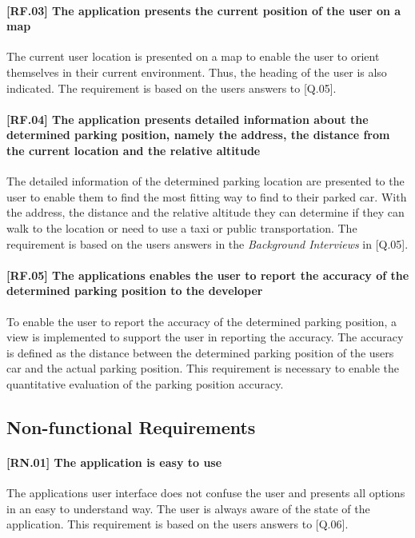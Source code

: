 \paragraph{[RF.03] The application presents the current position of the user on a map}
The current user location is presented on a map to enable the user to orient themselves in their current environment. Thus, the heading of the user is also indicated. The requirement is based on the users answers to [Q.05].

\paragraph{[RF.04] The application presents detailed information about the determined parking position, namely the address, the distance from the current location and the relative altitude}
The detailed information of the determined parking location are presented to the user to enable them to find the most fitting way to find to their parked car. With the address, the distance and the relative altitude they can determine if they can walk to the location or need to use a taxi or public transportation. The requirement is based on the users answers in the \textit{Background Interviews} in [Q.05].

\paragraph{[RF.05] The applications enables the user to report the accuracy of the determined parking position to the developer}
To enable the user to report the accuracy of the determined parking position, a view is implemented to support the user in reporting the accuracy. The accuracy is defined as the distance between the determined parking position of the users car and the actual parking position. This requirement is necessary to enable the quantitative evaluation of the parking position accuracy. 

\subsection{Non-functional Requirements}

\paragraph{[RN.01] The application is easy to use}
The applications user interface does not confuse the user and presents all options in an easy to understand way. The user is always aware of the state of the application. This requirement is based on the users answers to [Q.06].

